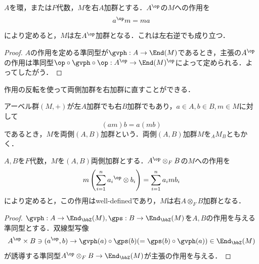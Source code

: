 \documentclass[a4paper,11pt]{jsarticle}
\begin{document}
\begin{prop}[作用の反転]\label{prop:opposite_action}
  $A$を環，または$F$代数，$M$を右$A$加群とする．$A^{\op}$の$M$への作用を
  \[
    a^{\op} m=ma
  \]
  により定めると，$M$は左$A^{\op}$加群となる．これは左右逆でも成り立つ．
\end{prop}
\begin{proof}
  $A$の作用を定める準同型が$\gvph:A\to\End(M)$であるとき，主張の$A^{\op}$の作用は準同型$\op\circ \gvph\circ\op:A^{\op}\to\End(M)^{\op}$によって定められる．よってしたがう．
\end{proof}
作用の反転を使って両側加群を右加群に直すことができる．
\begin{dfn}[両側加群]
  アーベル群$(M,+)$が左$A$加群でも右$B$加群でもあり，$a\in A,b\in B,m\in M$に対して
  \[
    (am)b=a(mb)
  \]
  であるとき，$M$を両側$(A,B)$加群という．両側$(A,B)$加群$M$を${}_AM_B$ともかく．
\end{dfn}\begin{prop}[両側加群を右加群に]\label{prop:bimod_to_mod}
  $A,B$を$F$代数，$M$を$(A,B)$両側加群とする．$A^{\op}\otimes_F B$の$M$への作用を
  \[
    m\left(\sum_{i=1}^n {a_i}^{\op}\otimes {b_i}\right)=\sum_{i=1}^n a_imb_i
  \]
  により定めると，この作用はwell-definedであり，$M$は右$A\otimes_F B$加群となる．
\end{prop}
\begin{proof}
  $\gvph:A\to\End_\bbZ(M),\gps:B\to\End_\bbZ(M)$を$A,B$の作用を与える準同型とする．双線型写像
  \[
    A^{\op}\times B\ni (a^{\op},b)\to \gvph(a)\circ\gps(b)(=\gps(b)\circ\gvph(a))\in\End_\bbZ(M)
  \]
  が誘導する準同型$A^{\op}\otimes_F B\to \End_\bbZ(M)$が主張の作用を与える．
\end{proof}
\end{document}
